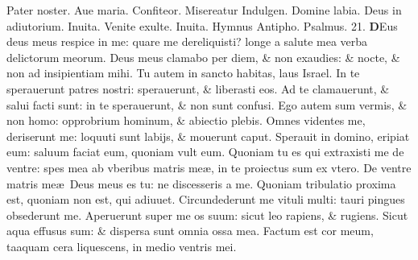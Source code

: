\documentclass[a5paper,10pt]{book}
\def\ae{æ}
\begin{document}
\begin{multicols*}{2}
\begin{center}
\end{center}
\vspace{-1em}
\par \noindent \color{red} P\color{black}ater noster. Aue maria. Confiteor. Misereatur Indulgen. Domine labia. Deus in adiutorium. \color{red} Inuita. \color{black} Venite exulte. \color{red} Inuita. Hymnus Antipho. Psalmus. \hypertarget{ps21}{21.} \color{black}
\lettrine[lines=2]{\bfseries \color{red} D}{}Eus deus meus respice in me: quare me dereliquisti? longe a salute mea verba delictorum meorum.
\newline \color{red} D\color{black}eus meus clamabo per diem, \& non exaudies: \& nocte, \& non ad insipientiam mihi.
\newline \color{red} T\color{black}u autem in sancto habitas, laus Israel.
\newline \color{red} I\color{black}n te sperauerunt patres nostri: sperauerunt, \& liberasti eos.
\newline \color{red} A\color{black}d te clamauerunt, \& salui facti sunt: in te sperauerunt, \& non sunt confusi.
\newline \color{red} E\color{black}go autem sum vermis, \& non homo: opprobrium hominum, \& abiectio plebis.
\newline \color{red} O\color{black}mnes videntes me, deriserunt me: loquuti sunt labijs, \& mouerunt caput.
\newline \color{red} S\color{black}perauit in domino, eripiat eum: saluum faciat eum, quoniam vult eum.
\newline \color{red} Q\color{black}uoniam tu es qui extraxisti me de ventre: spes mea ab vberibus matris me\ae , in te proiectus sum ex vtero.
\newline \color{red} D\color{black}e ventre matris me\ae \ Deus meus es tu: ne discesseris a me.
\newline \color{red} Q\color{black}uoniam tribulatio proxima est, quoniam non est, qui adiuuet.
\newline \color{red} C\color{black}ircundederunt me vituli multi: tauri pingues obsederunt me.
\newline \color{red} A\color{black}peruerunt super me os suum: sicut leo rapiens, \& rugiens.
\newline \color{red} S\color{black}icut aqua effusus sum: \& dispersa sunt omnia ossa mea.
\newline \color{red} F\color{black}actum est cor meum, taaquam cera liquescens, in medio ventris mei.

\end{multicols*}
\end{document}
